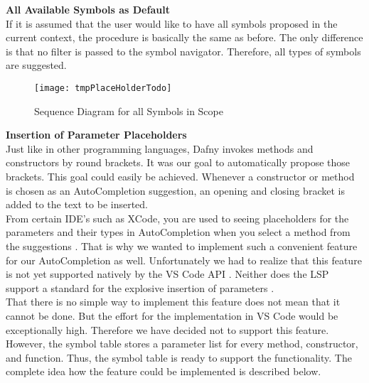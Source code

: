 \textbf{All Available Symbols as Default}\\
If it is assumed that the user would like to have all symbols proposed in the current context,
the procedure is basically the same as before.
The only difference is that no filter is passed to the symbol navigator.
Therefore, all types of symbols are suggested.

\begin{figure}[H]
    \centering
    \texttt{[image: tmpPlaceHolderTodo]}
    \caption{Sequence Diagram for all Symbols in Scope}
    \label{fig:default_completion_diagram}
\end{figure}


\textbf{Insertion of Parameter Placeholders}\\
Just like in other programming languages, Dafny invokes methods and constructors by round brackets.
It was our goal to automatically propose those brackets.
This goal could easily be achieved.
Whenever a constructor or method is chosen as an AutoCompletion suggestion,
an opening and closing bracket is added to the text to be inserted. \\

From certain IDE's such as XCode,
you are used to seeing placeholders for the parameters and their types in AutoCompletion
when you select a method from the suggestions \cite{sa}.
That is why we wanted to implement such a convenient feature for our AutoCompletion as well.
Unfortunately we had to realize that this feature is not yet supported natively by the VS Code API \cite{vscodeAPI}.
Neither does the LSP support a standard for the explosive insertion of parameters \cite{lspspec}. \\

That there is no simple way to implement this feature does not mean that it cannot be done.
But the effort for the implementation in VS Code would be exceptionally high.
Therefore we have decided not to support this feature.
However, the symbol table stores a parameter list for every method, constructor, and function.
Thus, the symbol table is ready to support the functionality.
The complete idea how the feature could be implemented is described below. \\

